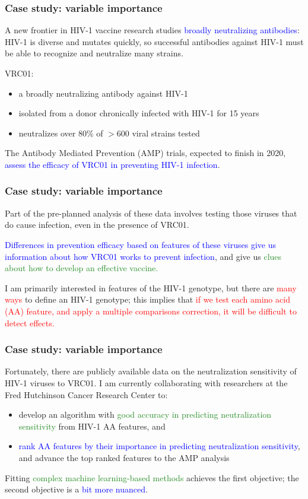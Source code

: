 \documentclass[12pt, 
hyperref={colorlinks=true, linkcolor=blue, urlcolor=cyan},dvipsnames]{beamer}
\begin{document}
\begin{frame}
\frametitle{Case study: variable importance}
A new frontier in HIV-1 vaccine research studies \textcolor{blue}{broadly neutralizing antibodies}: HIV-1 is diverse and mutates quickly, so successful antibodies against HIV-1 must be able to recognize and neutralize many strains.

VRC01: \vspace{-0.3cm}
\begin{itemize}
\item a broadly neutralizing antibody against HIV-1
\item isolated from a donor chronically infected with HIV-1 for 15 years
\item neutralizes over 80\% of $> 600$ viral strains tested
\end{itemize}

The Antibody Mediated Prevention (AMP) trials, expected to finish in 2020, \textcolor{blue}{assess the efficacy of VRC01 in preventing HIV-1 infection}.
\end{frame}

\begin{frame}
\frametitle{Case study: variable importance}
Part of the pre-planned analysis of these data involves testing those viruses that do cause infection, even in the presence of VRC01.

\textcolor{blue}{Differences in prevention efficacy based on features of these viruses give us information about how VRC01 works to prevent infection}, and give us \textcolor{ForestGreen}{clues about how to develop an effective vaccine.}

I am primarily interested in features of the HIV-1 genotype, but there are \textcolor{red}{many ways} to define an HIV-1 genotype; this implies that \textcolor{red}{if we test each amino acid (AA) feature, and apply a multiple comparisons correction, it will be difficult to detect effects. }
\end{frame}

\begin{frame}
\frametitle{Case study: variable importance}
Fortunately, there are publicly available data on the neutralization sensitivity of HIV-1 viruses to VRC01. I am currently collaborating with researchers at the Fred Hutchinson Cancer Research Center to:
\begin{itemize}
\item develop an algorithm with \textcolor{ForestGreen}{good accuracy in predicting neutralization sensitivity} from HIV-1 AA features, and
\item \textcolor{blue}{rank AA features by their importance in predicting neutralization sensitivity}, and advance the top ranked features to the AMP analysis
\end{itemize}

Fitting \textcolor{ForestGreen}{complex machine learning-based methods} achieves the first objective; the second objective is a \textcolor{blue}{bit more nuanced}.
\end{frame}
\end{document}
